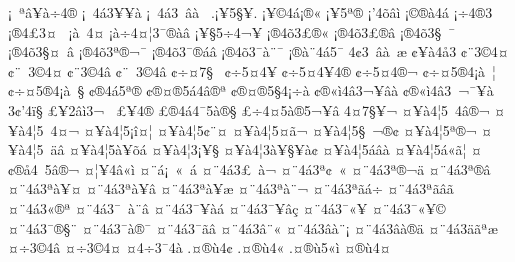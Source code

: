 {^^a1^^a0^^aa^^e2^^a5^^e0^^f74^^ae
^^a1^^a04^^e13^^a5^^ad^^a5^^e0
^^a1^^a04^^e13^^a0^^ad^^e2^^e0^^a0
.^^a1^^a55^^a7^^a5.
^^a1^^a5^^a94^^e1^^a1^^ae^^ab
^^a1^^a55^^aa^^ae^^ad
^^a1'4^^f5^^e2^^ec
^^a1^^a9^^ae^^e04^^ad^^e1
^^a1^^f74^^ae3
^^a1^^ae4^^a33^^a4^^a0^^ad
^^a1^^e0^^a0^^ad4^^a4
^^a1^^e0^^f74^^a4^^a63^^af^^ae^^e0^^e2
^^a1^^a5^^a75^^f74^^ac^^a5^^ad
^^a1^^ae4^^f53^^a3^^ae^^ab
^^a1^^ae4^^f53^^a3^^ae^^e2
^^a1^^ae4^^f53^^a7^^a0^^af
^^a1^^ae4^^f53^^a7^^a4^^a0^^e2
^^a1^^ae4^^f53^^aa^^ae^^ac^^af
^^a1^^ae4^^f53^^af^^ae^^e1^^e2
^^a1^^ae4^^f53^^af^^e0^^a8^^af
^^a1^^ae^^e0^^a84^^e15^^af
4^^a23^^a0^^ad^^e2^^e0^^a0^^e6
^^a2^^a5^^e04^^e53^^ad
^^a2^^a83^^a94^^a4
^^a2^^a8^^ad^^a03^^a94^^a4
^^a2^^a83^^a94^^e2
^^a2^^a8^^ad^^a03^^a94^^e2
^^a2^^f7^^a47^^a7^^ad^^a0
^^a2^^f75^^a44^^a5^^ad
^^a2^^f75^^a44^^a54^^ae
^^a2^^f75^^a44^^ae^^ac
^^a2^^f7^^a45^^ae4^^a1^^e0^^a0^^a6
^^a2^^f7^^a45^^ae4^^a1^^e0^^a0^^a7
^^a2^^ae4^^e15^^aa^^ae
^^a2^^ae^^a4^^ae5^^e14^^e2^^ae^^aa
^^a2^^ae^^a4^^ae5^^a74^^a1^^f7^^e0
^^a2^^ae^^ab^^ec4^^e23^^ac^^a5^^e2^^e0
^^a2^^ae^^ab^^ec4^^e23^^a0^^ac^^af^^a5^^e0
3^^a2'4^^ef^^a7
^^a3^^a52^^e2^^ec3^^ac^^a0^^ad
^^a3^^a54^^ae
^^a3^^ae4^^e14^^af5^^e0^^ae^^a7
^^a3^^f74^^a45^^e0^^ae5^^ac^^a5^^e2
4^^a47^^a7^^a5^^ac
^^a4^^a5^^e04^^a65^^a04^^e2^^ae^^ac
^^a4^^a5^^e04^^a65^^a04^^a4^^ac
^^a4^^a5^^e04^^a65^^a1^^ee^^a4^^a6
^^a4^^a5^^e04^^a65^^a2^^a8^^a4
^^a4^^a5^^e04^^a65^^a4^^e3^^ac
^^a4^^a5^^e04^^a65^^a7^^a0^^ac^^ae^^a2
^^a4^^a5^^e04^^a65^^aa^^ae^^ac
^^a4^^a5^^e04^^a65^^ad^^a0^^e4^^e2
^^a4^^a5^^e04^^a65^^e0^^a5^^f5^^e1
^^a4^^a5^^e04^^a63^^a1^^a5^^a7
^^a4^^a5^^e04^^a63^^e0^^a5^^a7^^a5^^e0^^a2
^^a4^^a5^^e04^^a65^^e1^^e2^^e0
^^a4^^a5^^e04^^a65^^e1^^ab^^e3^^a6
^^a4^^a2^^ae^^e54^^a05^^e2^^ae^^ac
^^a4^^a6^^a5^^ad4^^e2^^ab^^ec
^^a4^^a8^^e1^^a1^^a0^^ab^^a0^^ad^^e1
^^a4^^a84^^e13^^a3^^a0^^e0^^ac
^^a4^^a84^^e13^^aa^^a2^^a0^^ab
^^a4^^a84^^e13^^aa^^ae^^ac^^e4
^^a4^^a84^^e13^^aa^^ae^^ad^^e2
^^a4^^a84^^e13^^aa^^e0^^a5^^a4
^^a4^^a84^^e13^^aa^^e0^^a5^^e2
^^a4^^a84^^e13^^aa^^e0^^a5^^e6
^^a4^^a84^^e13^^aa^^e0^^a8^^ac
^^a4^^a84^^e13^^aa^^e3^^e1^^f7
^^a4^^a84^^e13^^aa^^e3^^e2^^e3
^^a4^^a84^^e13^^ab^^ae^^aa
^^a4^^a84^^e13^^af^^a0^^e0^^a8^^e2
^^a4^^a84^^e13^^af^^a5^^e0^^e1
^^a4^^a84^^e13^^af^^a5^^e2^^e7
^^a4^^a84^^e13^^af^^ab^^a5
^^a4^^a84^^e13^^af^^ab^^a5^^a9
^^a4^^a84^^e13^^af^^ae^^a7^^a8
^^a4^^a84^^e13^^af^^e0^^ae^^af
^^a4^^a84^^e13^^af^^e3^^e2
^^a4^^a84^^e13^^e2^^a8^^ab
^^a4^^a84^^e13^^e2^^e0^^a8^^a1
^^a4^^a84^^e13^^e2^^e0^^ae^^e4
^^a4^^a84^^e13^^e4^^e3^^ad^^aa^^e6
^^a4^^f73^^a94^^e2
^^a4^^f73^^a94^^a4
^^a44^^ad^^f73^^af4^^e0
.^^a4^^ae^^f94^^a2
.^^a4^^ae^^f94^^ab
.^^a4^^ae^^f95^^ab^^ec
^^a4^^ae^^f94^^a4
}
